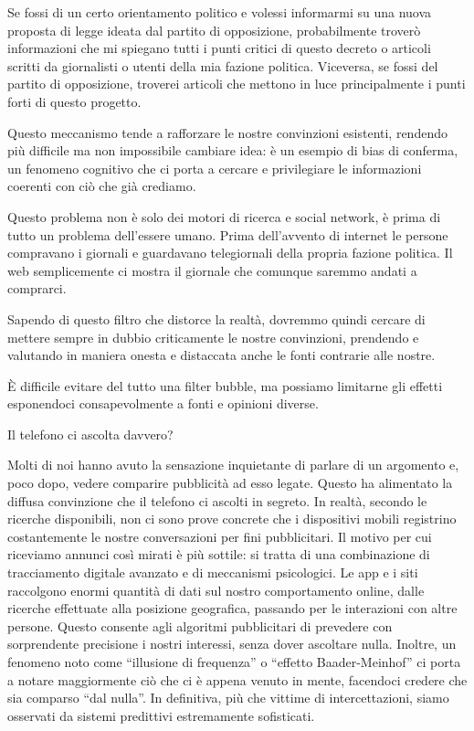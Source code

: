 \documentclass[12pt]{book} %
\begin{document}
Se fossi di un certo orientamento politico e volessi informarmi su una nuova proposta di legge ideata dal partito di
opposizione, probabilmente troverò informazioni che mi spiegano tutti i punti critici di questo decreto o articoli
scritti da giornalisti o utenti della mia fazione politica. Viceversa, se fossi del partito di opposizione, troverei
articoli che mettono in luce principalmente i punti forti di questo progetto.

Questo meccanismo tende a rafforzare le nostre convinzioni esistenti, rendendo più difficile ma non impossibile cambiare idea: è un esempio di bias di conferma, un fenomeno cognitivo che ci porta a cercare e privilegiare le informazioni coerenti con ciò che già crediamo.

Questo problema non è solo dei motori di ricerca e social network, è prima di tutto un problema
dell'essere umano. Prima dell'avvento di internet le persone compravano i
giornali e guardavano telegiornali della propria fazione politica. Il web semplicemente ci mostra il giornale che
comunque saremmo andati a comprarci.

Sapendo di questo filtro che distorce la realtà, dovremmo quindi cercare di mettere sempre in dubbio criticamente le
nostre convinzioni, prendendo e valutando in maniera onesta e distaccata anche le fonti contrarie alle nostre.

È difficile evitare del tutto una filter bubble, ma possiamo limitarne gli effetti esponendoci consapevolmente a fonti e opinioni diverse.

\begin{mdframed}[linewidth=1pt]
Il telefono ci ascolta davvero?

Molti di noi hanno avuto la sensazione inquietante di parlare di un argomento e, poco dopo, vedere comparire pubblicità ad esso legate. Questo ha alimentato la diffusa convinzione che il telefono ci ascolti in segreto. In realtà, secondo le ricerche disponibili, non ci sono prove concrete che i dispositivi mobili registrino costantemente le nostre conversazioni per fini pubblicitari. Il motivo per cui riceviamo annunci così mirati è più sottile: si tratta di una combinazione di tracciamento digitale avanzato e di meccanismi psicologici. Le app e i siti raccolgono enormi quantità di dati sul nostro comportamento online, dalle ricerche effettuate alla posizione geografica, passando per le interazioni con altre persone. Questo consente agli algoritmi pubblicitari di prevedere con sorprendente precisione i nostri interessi, senza dover ascoltare nulla. Inoltre, un fenomeno noto come “illusione di frequenza” o “effetto Baader-Meinhof” ci porta a notare maggiormente ciò che ci è appena venuto in mente, facendoci credere che sia comparso “dal nulla”. In definitiva, più che vittime di intercettazioni, siamo osservati da sistemi predittivi estremamente sofisticati.
\end{mdframed}
\end{document}
